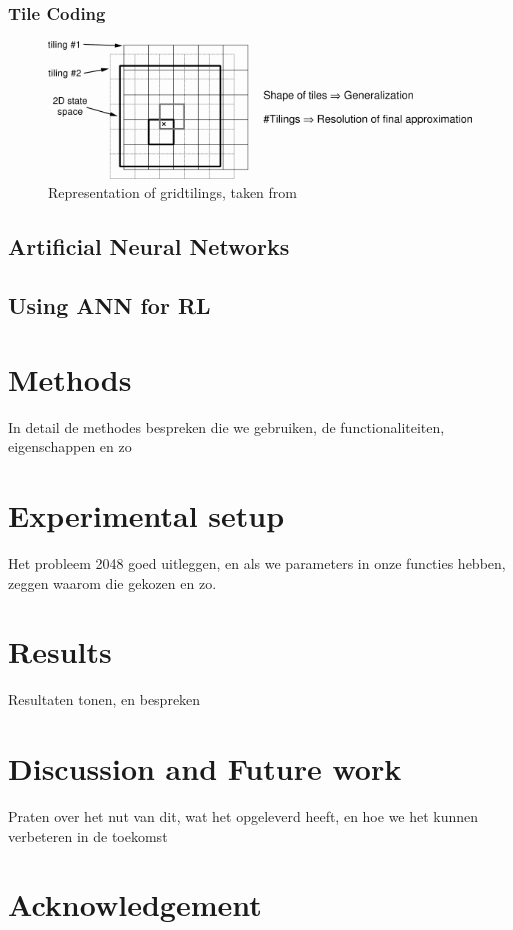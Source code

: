 \documentclass[a4paper,12pt]{article}
\begin{document}
\subsubsection{Tile Coding}
\begin{figure}[H]
\centering
\includegraphics[width=\textwidth]{img/figtmp54}
\caption{Representation of gridtilings, taken from \cite{sutton1998rl}}
\label{fig:figtmp54}
\end{figure}
\subsection{Artificial Neural Networks}
\subsection{Using ANN for RL}
\section{Methods}
In detail de methodes bespreken die we gebruiken, de functionaliteiten, eigenschappen en zo

\section{Experimental setup}
Het probleem 2048 goed uitleggen, en als we parameters in onze functies hebben, zeggen waarom die gekozen en zo.

\section{Results}
Resultaten tonen, en bespreken
\section{Discussion and Future work}
Praten over het nut van dit, wat het opgeleverd heeft, en hoe we het kunnen verbeteren in de toekomst
\section{Acknowledgement}



\end{document}
